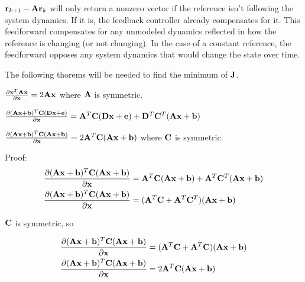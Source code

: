 \begin{remark}
  $\mathbf{r}_{k+1} - \mathbf{A}\mathbf{r}_k$ will only return a nonzero vector if the
  reference isn't following the system dynamics. If it is, the feedback
  controller already compensates for it. This feedforward compensates for any
  unmodeled dynamics reflected in how the reference is changing (or not
  changing). In the case of a constant reference, the feedforward opposes any
  system dynamics that would change the state over time.
\end{remark}

The following thorems will be needed to find the minimum of $\mathbf{J}$.

\begin{theorem}
  $\frac{\partial \mathbf{x}^T\mathbf{A}\mathbf{x}}{\partial\mathbf{x}} =
    2\mathbf{A}\mathbf{x}$ where $\mathbf{A}$ is symmetric.
  \label{thm:partial_xax}
\end{theorem}

\begin{theorem}
  $\frac{\partial (\mathbf{A}\mathbf{x} + \mathbf{b})^T\mathbf{C}
    (\mathbf{D}\mathbf{x} + \mathbf{e})}{\partial\mathbf{x}} =
    \mathbf{A}^T\mathbf{C}(\mathbf{D}\mathbf{x} + \mathbf{e}) + \mathbf{D}^T\mathbf{C}^T
    (\mathbf{A}\mathbf{x} + \mathbf{b})$
  \label{thm:partial_ax_b}
\end{theorem}

\begin{corollary}
  $\frac{\partial (\mathbf{A}\mathbf{x} + \mathbf{b})^T\mathbf{C}
    (\mathbf{A}\mathbf{x} + \mathbf{b})}{\partial\mathbf{x}} =
    2\mathbf{A}^T\mathbf{C}(\mathbf{A}\mathbf{x} + \mathbf{b})$ where $\mathbf{C}$ is symmetric.
  \label{cor:partial_ax_b}

  Proof:
  \begin{align*}
    \frac{\partial (\mathbf{A}\mathbf{x} + \mathbf{b})^T\mathbf{C}
      (\mathbf{A}\mathbf{x} + \mathbf{b})}{\partial\mathbf{x}} &=
      \mathbf{A}^T\mathbf{C}(\mathbf{A}\mathbf{x} + \mathbf{b}) + \mathbf{A}^T\mathbf{C}^T
      (\mathbf{A}\mathbf{x} + \mathbf{b}) \\
    \frac{\partial (\mathbf{A}\mathbf{x} + \mathbf{b})^T\mathbf{C}
      (\mathbf{A}\mathbf{x} + \mathbf{b})}{\partial\mathbf{x}} &=
      (\mathbf{A}^T\mathbf{C} + \mathbf{A}^T\mathbf{C}^T)(\mathbf{A}\mathbf{x} + \mathbf{b})
  \end{align*}

  $\mathbf{C}$ is symmetric, so

  \begin{align*}
    \frac{\partial (\mathbf{A}\mathbf{x} + \mathbf{b})^T\mathbf{C}
      (\mathbf{A}\mathbf{x} + \mathbf{b})}{\partial\mathbf{x}} &=
      (\mathbf{A}^T\mathbf{C} + \mathbf{A}^T\mathbf{C})(\mathbf{A}\mathbf{x} + \mathbf{b}) \\
    \frac{\partial (\mathbf{A}\mathbf{x} + \mathbf{b})^T\mathbf{C}
      (\mathbf{A}\mathbf{x} + \mathbf{b})}{\partial\mathbf{x}} &=
      2\mathbf{A}^T\mathbf{C}(\mathbf{A}\mathbf{x} + \mathbf{b})
  \end{align*}
\end{corollary}

